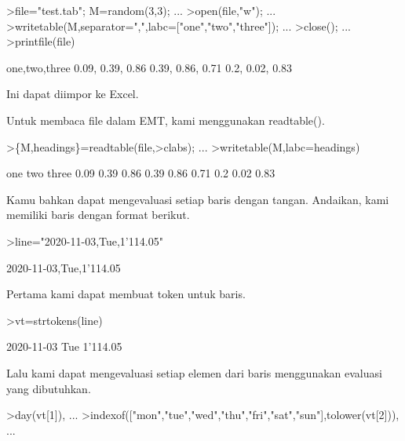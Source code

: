 \documentclass[a4paper,10pt]{article}
\begin{document}
\begin{eulernotebook}
\begin{eulercomment}
\begin{eulercomment}
\begin{eulercomment}
\begin{eulercomment}
\begin{eulercomment}
\begin{eulercomment}
\begin{eulercomment}
\end{eulercomment}
\begin{eulerprompt}
>file="test.tab"; M=random(3,3);  ...
>open(file,"w");  ...
>writetable(M,separator=",",labc=["one","two","three"]);  ...
>close(); ...
>printfile(file)
\end{eulerprompt}
\begin{euleroutput}
  one,two,three
        0.09,      0.39,      0.86
        0.39,      0.86,      0.71
         0.2,      0.02,      0.83
\end{euleroutput}
\begin{eulercomment}
Ini dapat diimpor ke Excel.

Untuk membaca file dalam EMT, kami menggunakan readtable().
\end{eulercomment}
\begin{eulerprompt}
>\{M,headings\}=readtable(file,>clabs); ...
>writetable(M,labc=headings)
\end{eulerprompt}
\begin{euleroutput}
         one       two     three
        0.09      0.39      0.86
        0.39      0.86      0.71
         0.2      0.02      0.83
\end{euleroutput}
\begin{eulercomment}
Kamu bahkan dapat mengevaluasi setiap baris dengan tangan. Andaikan,
kami memiliki baris dengan format berikut.
\end{eulercomment}
\begin{eulerprompt}
>line="2020-11-03,Tue,1'114.05"
\end{eulerprompt}
\begin{euleroutput}
  2020-11-03,Tue,1'114.05
\end{euleroutput}
\begin{eulercomment}
Pertama kami dapat membuat token untuk baris.
\end{eulercomment}
\begin{eulerprompt}
>vt=strtokens(line)
\end{eulerprompt}
\begin{euleroutput}
  2020-11-03
  Tue
  1'114.05
\end{euleroutput}
\begin{eulercomment}
Lalu kami dapat mengevaluasi setiap elemen dari baris menggunakan
evaluasi yang dibutuhkan.
\end{eulercomment}
\begin{eulerprompt}
>day(vt[1]),  ...
>indexof(["mon","tue","wed","thu","fri","sat","sun"],tolower(vt[2])),  ...

\end{eulerprompt}
\end{eulercomment}
\end{eulercomment}
\end{eulercomment}
\end{eulercomment}
\end{eulercomment}
\end{eulercomment}
\end{eulernotebook}
\end{document}
